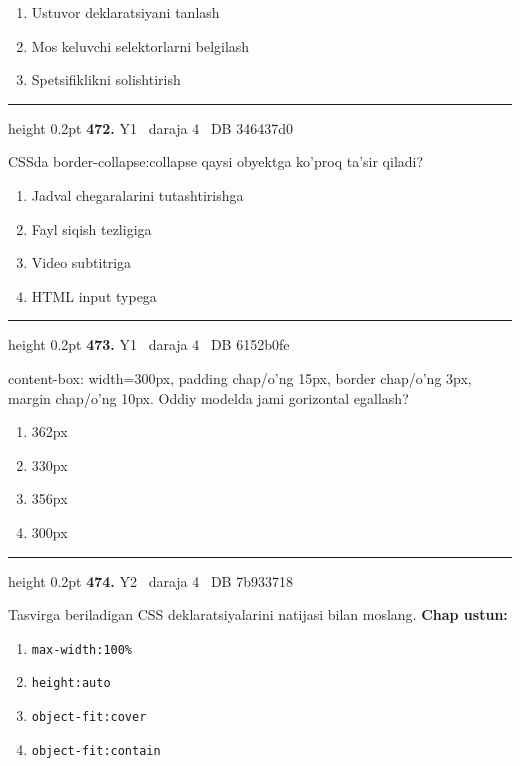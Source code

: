 \documentclass[10pt,a4paper,oneside]{article}
\begin{document}
\begin{enumerate}[label=\Alph*),leftmargin=9mm]
\item Ustuvor deklaratsiyani tanlash
\item Mos keluvchi selektorlarni belgilash
\item Spetsifiklikni solishtirish
\end{enumerate}
\vspace{2mm}\hrule height 0.2pt \vspace{4mm}
\hypertarget{q472}{\textbf{\color{ink}472.}}  {\color{muted}\scriptsize Y1 \textbullet\ daraja 4 \textbullet\ DB 346437d0}
\par
CSSda border-collapse:collapse qaysi obyektga ko'proq ta'sir qiladi?
\begin{enumerate}[label=\Alph*),leftmargin=9mm]
\item Jadval chegaralarini tutashtirishga
\item Fayl siqish tezligiga
\item Video subtitriga
\item HTML input typega
\end{enumerate}
\vspace{2mm}\hrule height 0.2pt \vspace{4mm}
\hypertarget{q473}{\textbf{\color{ink}473.}}  {\color{muted}\scriptsize Y1 \textbullet\ daraja 4 \textbullet\ DB 6152b0fe}
\par
content-box: width=300px, padding chap/o'ng 15px, border chap/o'ng 3px, margin chap/o'ng 10px. Oddiy modelda jami gorizontal egallash?
\begin{enumerate}[label=\Alph*),leftmargin=9mm]
\item 362px
\item 330px
\item 356px
\item 300px
\end{enumerate}
\vspace{2mm}\hrule height 0.2pt \vspace{4mm}
\hypertarget{q474}{\textbf{\color{ink}474.}}  {\color{muted}\scriptsize Y2 \textbullet\ daraja 4 \textbullet\ DB 7b933718}
\par
Tasvirga beriladigan CSS deklaratsiyalarini natijasi bilan moslang.
\textbf{\footnotesize Chap ustun:}
\begin{enumerate}[label=\arabic*),leftmargin=9mm]
\item \texttt{max-width:100\%}
\item \texttt{height:auto}
\item \texttt{object-fit:cover}
\item \texttt{object-fit:contain}
\end{enumerate}
\end{document}
